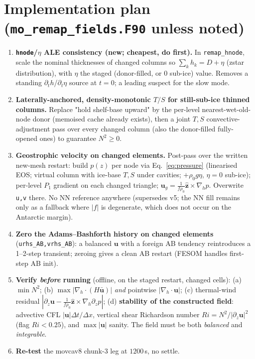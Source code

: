 \documentclass[11pt,a4paper]{article}
\newcommand{\code}[1]{\texttt{#1}}
\newcommand{\uvec}{\mathbf{u}}
\newcommand{\zhat}{\hat{\mathbf{z}}}
\begin{document}
\section{Implementation plan (\code{mo\_remap\_fields.F90} unless noted)}\label{sec:impl}
\begin{enumerate}[leftmargin=1.8em,itemsep=2pt,label=\textbf{\Roman*.}]
  \item \textbf{\code{hnode}/$\eta$ ALE consistency (new; cheapest, do first).} In
        \code{remap\_hnode}, scale the nominal thicknesses of changed columns so
        $\sum_k h_k = D + \eta$ (zstar distribution), with $\eta$ the staged (donor-filled, or 0
        sub-ice) value. Removes a standing $\partial_t h$/$\partial_t\eta$ source at $t{=}0$; a
        leading suspect for the slow mode.
  \item \textbf{Laterally-anchored, density-monotonic $T/S$ for still-sub-ice thinned columns.}
        Replace "hold shelf-base upward" by the per-level nearest-wet-old-node donor (memoised
        cache already exists), then a joint $T,S$ convective-adjustment pass over every changed
        column (also the donor-filled fully-opened ones) to guarantee $N^2\ge0$.
  \item \textbf{Geostrophic velocity on changed elements.} Post-pass over the written new-mesh
        restart: build $p(z)$ per node via Eq.~\eqref{eq:pressure} (linearised EOS; virtual
        column with ice-base $T,S$ under cavities; $+\rho_0 g\eta$, $\eta{=}0$ sub-ice); per-level
        $P_1$ gradient on each changed triangle; $\uvec_g=\tfrac{1}{f\rho_0}\zhat\times\nabla_h p$.
        Overwrite \code{u,v} there. No NN reference anywhere (supersedes v5; the NN fill remains
        only as a fallback where $|f|$ is degenerate, which does not occur on the Antarctic margin).
  \item \textbf{Zero the Adams--Bashforth history on changed elements}
        (\code{urhs\_AB,vrhs\_AB}): a balanced $\uvec$ with a foreign AB tendency reintroduces a
        1--2-step transient; zeroing gives a clean AB restart (FESOM handles first-step AB init).
  \item \textbf{Verify \emph{before} running} (offline, on the staged restart, changed cells):
        (a) $\min N^2$; (b) $\max|\nabla_h\!\cdot(H\bar{\uvec})|$ \emph{and} pointwise
        $|\nabla_h\!\cdot\uvec|$; (c) thermal-wind residual
        $|\partial_z\uvec-\tfrac{1}{f\rho_0}\zhat\times\nabla_h\partial_z p|$;
        (d) \textbf{stability of the constructed field}: advective CFL
        $|\uvec|\Delta t/\Delta x$, vertical shear Richardson number
        $Ri=N^2/|\partial_z\uvec|^2$ (flag $Ri<0.25$), and $\max|\uvec|$ sanity. The field must be
        both \emph{balanced} and \emph{integrable}.
  \item \textbf{Re-test} the movcav8 chunk-3 leg at $1200$\,s, no settle.
\end{enumerate}
\end{document}
